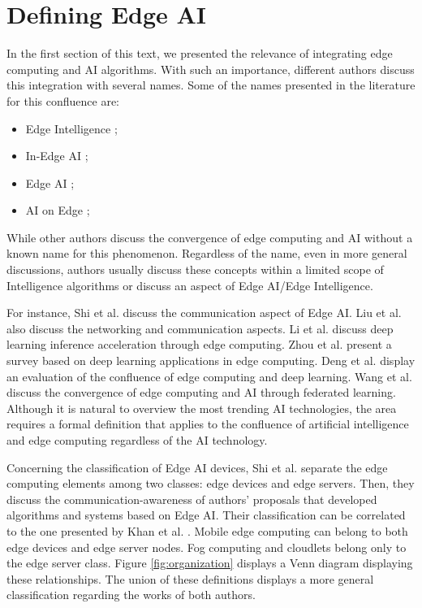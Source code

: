 \section{Defining Edge AI}
\label{sec:defining}

In the first section of this text, we presented the relevance of integrating edge computing and AI algorithms. With such an importance, different authors discuss this integration with several names. Some of the names presented in the literature for this confluence are:

\begin{itemize}
    \item Edge Intelligence \cite{deng2020edge,zhou2019edge,liu2020toward};
    \item In-Edge AI \cite{wang2019edge};
    \item Edge AI \cite{li2019edge,lee2018techology};
    \item AI on Edge \cite{greengard2020ai};
\end{itemize}

While other authors discuss the convergence of edge computing and AI without a known name for this phenomenon. Regardless of the name, even in more general discussions, authors usually discuss these concepts within a limited scope of Intelligence algorithms or discuss an aspect of Edge AI/Edge Intelligence.

For instance, Shi et al. \cite{shi2016promise} discuss the communication aspect of Edge AI. Liu et al. \cite{liu2020toward} also discuss the networking and communication aspects. Li et al. \cite{li2019edge} discuss deep learning inference acceleration through edge computing. Zhou et al. \cite{zhou2019edge} present a survey based on deep learning applications in edge computing. Deng et al. \cite{deng2020edge} display an evaluation of the confluence of edge computing and deep learning. Wang et al. \cite{wang2019edge} discuss the convergence of edge computing and AI through federated learning. Although it is natural to overview the most trending AI technologies, the area requires a formal definition that applies to the confluence of artificial intelligence and edge computing regardless of the AI technology.

Concerning the classification of Edge AI devices, Shi et al. \cite{shi2016promise} separate the edge computing elements among two classes: edge devices and edge servers. Then, they discuss the communication-awareness of authors' proposals that developed algorithms and systems based on Edge AI. Their classification can be correlated to the one presented by Khan et al. \cite{khan2019edge}. Mobile edge computing can belong to both edge devices and edge server nodes. Fog computing and cloudlets belong only to the edge server class. Figure \ref{fig:organization} displays a Venn diagram displaying these relationships. The union of these definitions displays a more general classification regarding the works of both authors.

